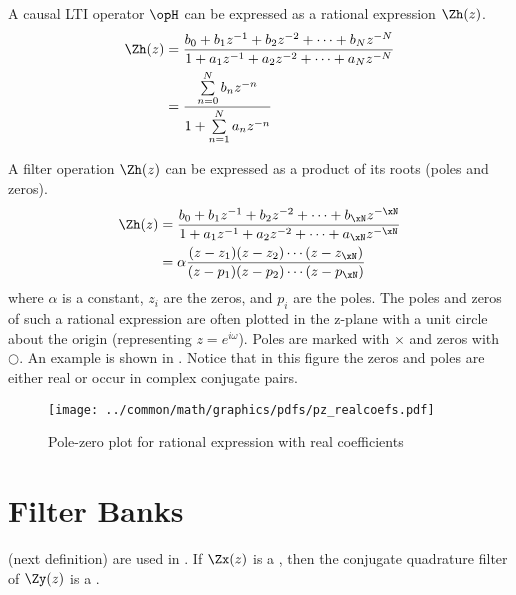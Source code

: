 \begin{lemma}
A causal LTI operator $\opH$ can be expressed as a rational expression $\Zh(z)$.
\begin{align*}
 \Zh(z) &= \frac{b_0 + b_1z^{-1} + b_2z^{-2} + \cdots + b_Nz^{-N}}
                {1   + a_1z^{-1} + a_2z^{-2} + \cdots + a_Nz^{-N}}
   \\   &= \frac{\sum\limits_{n=0}^{N} b_n z^{-n}}
                {1   + \sum\limits_{n=1}^{N} a_n z^{-n}}
\end{align*}
\end{lemma}

A filter operation $\Zh(z)$ can be expressed as a product of its roots (poles and zeros).
\begin{align*}
 \Zh(z) &= \frac{b_0 + b_1z^{-1} + b_2z^{-2} + \cdots + b_\xN z^{-\xN}}
                {1   + a_1z^{-1} + a_2z^{-2} + \cdots + a_\xN z^{-\xN}}
   \\   &= \alpha\frac{(z-z_1)(z-z_2)\cdots(z-z_\xN)}
                {(z-p_1)(z-p_2)\cdots(z-p_\xN)}
\end{align*}
where $\alpha$ is a constant, $z_i$ are the zeros, and $p_i$ are the poles.
The poles and zeros of such a rational expression are often plotted in the z-plane with a unit circle
about the origin (representing $z=e^{i\omega}$).
Poles are marked with $\times$ and zeros with $\bigcirc$.
An example is shown in .
Notice that in this figure the zeros and poles are either real or occur in
complex conjugate pairs.

\begin{figure}[ht]
  \centering
  \texttt{[image: ../common/math/graphics/pdfs/pz\_realcoefs.pdf]}
  \caption{
     Pole-zero plot for rational expression with real coefficients
     \label{fig:pz}
     }
\end{figure}

\section{Filter Banks}
 (next definition) are used in .
If $\Zx(z)$ is a , then the conjugate quadrature filter of $\Zy(z)$ is a .

